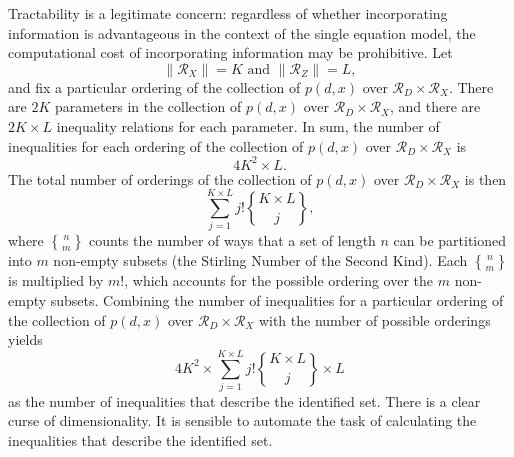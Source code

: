 \documentclass[10pt,a4paper,twoside]{article}
\DeclareRobustCommand{\stirling}{\genfrac\{\}{0pt}{}}
\numberwithin{equation}{section}
\begin{document}
Tractability is a legitimate concern: regardless of whether incorporating information is advantageous in the context of the single equation model, the computational cost of incorporating information may be prohibitive. Let
\[\|\mathcal{R}_X\|=K\text{ and }\|\mathcal{R}_Z\|=L,\]
and fix a particular ordering of the collection of $p(d,x)$ over $\mathcal{R}_D\times\mathcal{R}_X$. There are $2K$ parameters in the collection  of $p(d,x)$ over $\mathcal{R}_D\times\mathcal{R}_X$, and there are $2K\times L$ inequality relations for each parameter. In sum, the number of inequalities for each ordering of the collection of $p(d,x)$ over $\mathcal{R}_D\times\mathcal{R}_X$ is
\[4K^2\times L.\]
The total number of orderings of the collection of $p(d,x)$ over $\mathcal{R}_D\times\mathcal{R}_X$ is then
\[\sum_{j=1}^{K\times L}j!\stirling{K\times L}{j},\]
where $\stirling{n}{m}$ counts the number of ways that a set of length $n$ can be partitioned into $m$ non-empty subsets (the Stirling Number of the Second Kind). Each $\stirling{n}{m}$ is multiplied by $m!$, which accounts for the possible ordering over the $m$ non-empty subsets. Combining the number of inequalities for a particular ordering of the collection of $p(d,x)$ over $\mathcal{R}_D\times\mathcal{R}_X$ with the number of possible orderings yields
\[4K^2\times\sum_{j=1}^{K\times L}j!\stirling{K\times L}{j}\times L\]
as the number of inequalities that describe the identified set. There is a clear curse of dimensionality. It is sensible to automate the task of calculating the inequalities that describe the identified set.
%
\end{document}
